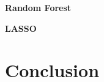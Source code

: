 \documentclass[12pt]{article}
\begin{document}
\begin{onehalfspace}
\begin{table}[H]
    \vspace{10pt}

    \begin{minipage}[t]{0.48\textwidth}
        \centering
        \textbf{Random Forest}\\[4pt]
        \resizebox{\linewidth}{!}{%
            
        }
    \end{minipage}\hfill
    \begin{minipage}[t]{0.48\textwidth}
        \centering
        \textbf{LASSO}\\[4pt]
        \resizebox{\linewidth}{!}{%
            
        }
    \end{minipage}
\end{table}









\section{Conclusion}




\end{onehalfspace}
\end{document}

